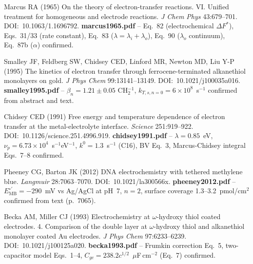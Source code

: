 \documentclass[10pt,a4paper]{article}
\numberwithin{equation}{section}
\newcommand{\Eo}{E^{\circ\prime}}
\begin{document}
\begin{enumerate}[label={[\arabic*]},noitemsep,leftmargin=*]

\item Marcus RA (1965) On the theory of electron-transfer reactions.
  VI. Unified treatment for homogeneous and electrode reactions.
  \textit{J Chem Phys} 43:679--701. DOI:~10.1063/1.1696792.
  \textbf{marcus1965.pdf} -- Eq.~82 (electrochemical $\Delta F^*$),
  Eqs.~31/33 (rate constant), Eq.~83 ($\lambda = \lambda_i + \lambda_o$),
  Eq.~90 ($\lambda_o$ continuum), Eq.~87b ($\alpha$) confirmed.

\item Smalley JF, Feldberg SW, Chidsey CED, Linford MR, Newton MD,
  Liu Y-P (1995) The kinetics of electron transfer through
  ferrocene-terminated alkanethiol monolayers on gold.
  \textit{J Phys Chem} 99:13141--13149. DOI:~10.1021/j100035a016.
  \textbf{smalley1995.pdf} -- $\beta_n = 1.21 \pm 0.05$
  CH$_2^{-1}$, $k_{T,s,n=0} = 6\times10^8$~s$^{-1}$ confirmed
  from abstract and text.

\item Chidsey CED (1991) Free energy and temperature dependence of
  electron transfer at the metal-electrolyte interface.
  \textit{Science} 251:919--922. DOI:~10.1126/science.251.4996.919.
  \textbf{chidsey1991.pdf} -- $\lambda = 0.85$~eV,
  $\nu_p = 6.73\times10^4$~s$^{-1}$eV$^{-1}$, $k^0 = 1.3$~s$^{-1}$
  (C16), BV Eq.~3, Marcus-Chidsey integral Eqs.~7--8 confirmed.

\item Pheeney CG, Barton JK (2012) DNA electrochemistry with tethered
  methylene blue. \textit{Langmuir} 28:7063--7070.
  DOI:~10.1021/la300566x.
  \textbf{pheeney2012.pdf} -- $\Eo_{\text{MB}} = -290$~mV vs
  Ag/AgCl at pH~7, $n=2$, surface coverage 1.3--3.2~pmol/cm$^2$
  confirmed from text (p.~7065).

\item Becka AM, Miller CJ (1993) Electrochemistry at $\omega$-hydroxy
  thiol coated electrodes. 4. Comparison of the double layer at
  $\omega$-hydroxy thiol and alkanethiol monolayer coated Au
  electrodes. \textit{J Phys Chem} 97:6233--6239.
  DOI:~10.1021/j100125a020.
  \textbf{becka1993.pdf} -- Frumkin correction Eq.~5, two-capacitor
  model Eqs.~1--4, $C_{gc} = 238.2c^{1/2}$~$\mu$F\,cm$^{-2}$
  (Eq.~7) confirmed.

\end{enumerate}
\end{document}
